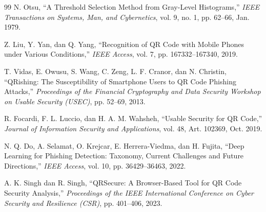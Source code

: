 \documentclass[conference]{IEEEtran}
\begin{document}
\begin{thebibliography}{99}
N. Otsu, ``A Threshold Selection Method from Gray-Level Histograms,'' \textit{IEEE Transactions on Systems, Man, and Cybernetics}, vol. 9, no. 1, pp. 62--66, Jan. 1979.

Z. Liu, Y. Yan, dan Q. Yang, ``Recognition of QR Code with Mobile Phones under Various Conditions,'' \textit{IEEE Access}, vol. 7, pp. 167332--167340, 2019.

T. Vidas, E. Owusu, S. Wang, C. Zeng, L. F. Cranor, dan N. Christin, ``QRishing: The Susceptibility of Smartphone Users to QR Code Phishing Attacks,'' \textit{Proceedings of the Financial Cryptography and Data Security Workshop on Usable Security (USEC)}, pp. 52--69, 2013.

R. Focardi, F. L. Luccio, dan H. A. M. Wahsheh, ``Usable Security for QR Code,'' \textit{Journal of Information Security and Applications}, vol. 48, Art. 102369, Oct. 2019.

N. Q. Do, A. Selamat, O. Krejcar, E. Herrera-Viedma, dan H. Fujita, ``Deep Learning for Phishing Detection: Taxonomy, Current Challenges and Future Directions,'' \textit{IEEE Access}, vol. 10, pp. 36429--36463, 2022.

A. K. Singh dan R. Singh, ``QRSecure: A Browser-Based Tool for QR Code Security Analysis,'' \textit{Proceedings of the IEEE International Conference on Cyber Security and Resilience (CSR)}, pp. 401--406, 2023.

\end{thebibliography}
\end{document}
